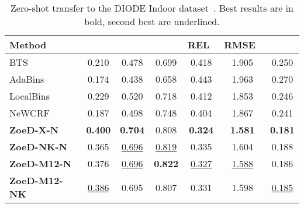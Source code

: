 \documentclass[10pt,twocolumn,letterpaper]{article}
\begin{document}
\begin{table}[htb]
\centering
\setlength{\tabcolsep}{3pt} \small
\begin{tabular}{@{}lcccccc@{}}
\toprule
Method &  &  &  & REL~ & RMSE~ & \\ \midrule
BTS~\cite{bts_lee2019big}               & 0.210     & 0.478     & 0.699     & 0.418    & 1.905     & 0.250    \\ 
AdaBins~\cite{bhat2021adabins}          & 0.174     & 0.438     & 0.658     & 0.443    & 1.963     & 0.270    \\ 
LocalBins~\cite{bhat2022localbins}      & 0.229 & 0.520  & 0.718 &     0.412 &  1.853 &    0.246     \\
NeWCRF~\cite{yuan2022new}               & 0.187     & 0.498     & 0.748     & 0.404    & 1.867     & 0.241     \\ 
\midrule
\textbf{ZoeD-X-N}       & \textbf{0.400}   & \textbf{0.704} & 0.808 &     \textbf{0.324} &  \textbf{1.581} &    \textbf{0.181} \\ 
\textbf{ZoeD-NK-N}      & 0.365 & \underline{0.696} & \underline{0.819} &     0.335 &  1.604 &    0.188 \\
\textbf{ZoeD-M12-N}  & 0.376 & \underline{0.696} & \textbf{0.822} &    \underline{0.327} & \underline{1.588} &   0.186 \\
\textbf{ZoeD-M12-NK}    & \underline{0.386} & 0.695 & 0.807 & 0.331 &   1.598 &     \underline{0.185} \\
\bottomrule
\end{tabular}
\caption{Zero-shot transfer to the DIODE Indoor dataset~\cite{diode_dataset}. Best results are in bold, second best are underlined.}
\label{tab:diode-indoor-full}
\end{table}
\end{document}
